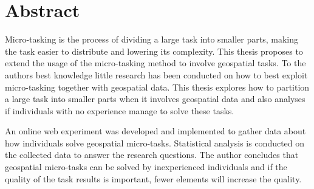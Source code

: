 \chapter*{Abstract}
%

Micro-tasking is the process of dividing a large task into smaller parts, making the task easier to distribute and lowering its complexity. This thesis proposes to extend the usage of the micro-tasking method to involve geospatial tasks. To the authors best knowledge little research has been conducted on how to best exploit micro-tasking together with geospatial data. This thesis explores how to partition a large task into smaller parts when it involves geospatial data and also analyses if individuals with no experience manage to solve these tasks.  

An online web experiment was developed and implemented to gather data about how individuals solve geospatial micro-tasks. Statistical analysis is conducted on the collected data to answer the research questions. The author concludes that geospatial micro-tasks can be solved by inexperienced individuals and if the quality of the task results is important, fewer elements will increase the quality. 


